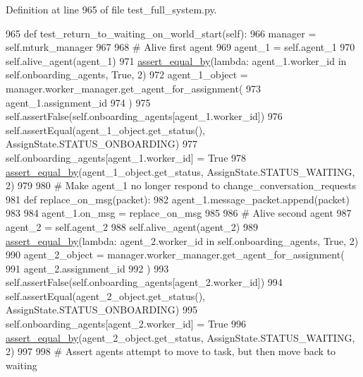 Definition at line 965 of file test\+\_\+full\+\_\+system.\+py.


\begin{DoxyCode}
965     \textcolor{keyword}{def }test\_return\_to\_waiting\_on\_world\_start(self):
966         manager = self.mturk\_manager
967 
968         \textcolor{comment}{# Alive first agent}
969         agent\_1 = self.agent\_1
970         self.alive\_agent(agent\_1)
971         \hyperlink{namespaceparlai_1_1mturk_1_1core_1_1test_1_1test__full__system_a0b463246d35658a2e422010f13dcf819}{assert\_equal\_by}(\textcolor{keyword}{lambda}: agent\_1.worker\_id \textcolor{keywordflow}{in} self.onboarding\_agents, \textcolor{keyword}{True}, 2)
972         agent\_1\_object = manager.worker\_manager.get\_agent\_for\_assignment(
973             agent\_1.assignment\_id
974         )
975         self.assertFalse(self.onboarding\_agents[agent\_1.worker\_id])
976         self.assertEqual(agent\_1\_object.get\_status(), AssignState.STATUS\_ONBOARDING)
977         self.onboarding\_agents[agent\_1.worker\_id] = \textcolor{keyword}{True}
978         \hyperlink{namespaceparlai_1_1mturk_1_1core_1_1test_1_1test__full__system_a0b463246d35658a2e422010f13dcf819}{assert\_equal\_by}(agent\_1\_object.get\_status, AssignState.STATUS\_WAITING, 2)
979 
980         \textcolor{comment}{# Make agent\_1 no longer respond to change\_conversation\_requests}
981         \textcolor{keyword}{def }replace\_on\_msg(packet):
982             agent\_1.message\_packet.append(packet)
983 
984         agent\_1.on\_msg = replace\_on\_msg
985 
986         \textcolor{comment}{# Alive second agent}
987         agent\_2 = self.agent\_2
988         self.alive\_agent(agent\_2)
989         \hyperlink{namespaceparlai_1_1mturk_1_1core_1_1test_1_1test__full__system_a0b463246d35658a2e422010f13dcf819}{assert\_equal\_by}(\textcolor{keyword}{lambda}: agent\_2.worker\_id \textcolor{keywordflow}{in} self.onboarding\_agents, \textcolor{keyword}{True}, 2)
990         agent\_2\_object = manager.worker\_manager.get\_agent\_for\_assignment(
991             agent\_2.assignment\_id
992         )
993         self.assertFalse(self.onboarding\_agents[agent\_2.worker\_id])
994         self.assertEqual(agent\_2\_object.get\_status(), AssignState.STATUS\_ONBOARDING)
995         self.onboarding\_agents[agent\_2.worker\_id] = \textcolor{keyword}{True}
996         \hyperlink{namespaceparlai_1_1mturk_1_1core_1_1test_1_1test__full__system_a0b463246d35658a2e422010f13dcf819}{assert\_equal\_by}(agent\_2\_object.get\_status, AssignState.STATUS\_WAITING, 2)
997 
998         \textcolor{comment}{# Assert agents attempt to move to task, but then move back to waiting}

\end{DoxyCode}
